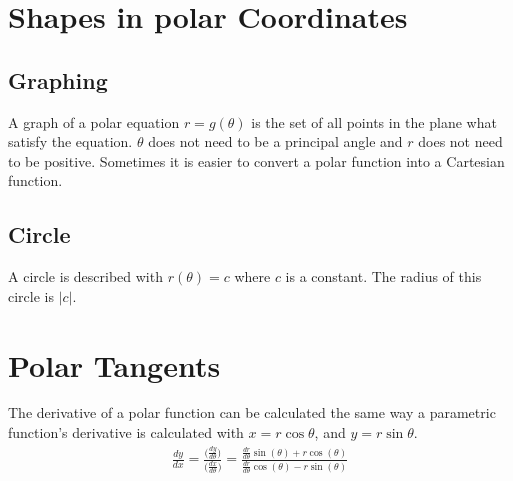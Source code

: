 \documentclass{article}
\theoremstyle{mytheoremstyle}
\theoremstyle{mytheoremstyle}
\theoremstyle{myproblemstyle}
\begin{document}
    \section*{Shapes in polar Coordinates}
    \subsection*{Graphing}
    A graph of a polar equation $r=g(\theta)$ is the set of all points in the
    plane what satisfy the equation. $\theta$ does not need to be a principal
    angle and $r$ does not need to be positive. Sometimes it is easier to
    convert a polar function into a Cartesian function.

    \subsection*{Circle}
    A circle is described with $r(\theta) = c$ where $c$ is a constant. The
    radius of this circle is $|c|$.

    \section*{Polar Tangents}
    The derivative of a polar function can be calculated the same way a
    parametric function's derivative is calculated with $x=r\cos \theta$, and
    $y=r\sin \theta$.
    \begin{align*}
        \frac{dy}{dx} = \frac{\Big(\frac{dy}{d\theta}\Big)}{\Big(\frac{dx}{d\theta}\Big)}
        = \frac{\frac{dr}{d\theta} \sin(\theta) + r\cos(\theta)}{\frac{dr}{d\theta} \cos(\theta) - r\sin(\theta)}
    \end{align*}
\end{document}
